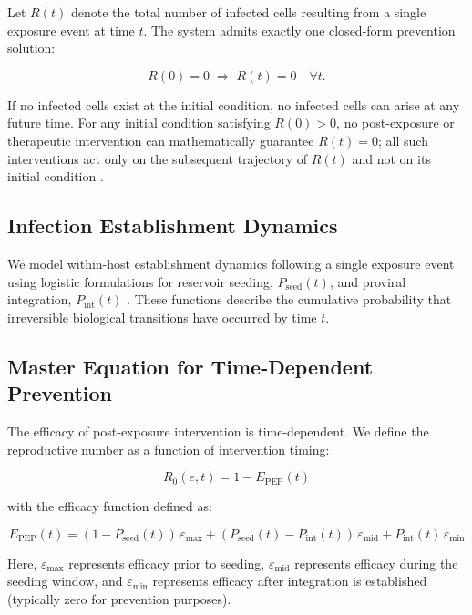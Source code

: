 \documentclass[12pt]{article}
\begin{document}
Let $R(t)$ denote the total number of infected cells resulting from a single exposure event at time $t$. The system admits exactly one closed-form prevention solution:

\begin{equation}
R(0) = 0 \;\Rightarrow\; R(t) = 0 \quad \forall t.
\end{equation}

If no infected cells exist at the initial condition, no infected cells can arise at any future time. For any initial condition satisfying $R(0) > 0$, no post-exposure or therapeutic intervention can mathematically guarantee $R(t)=0$; all such interventions act only on the subsequent trajectory of $R(t)$ and not on its initial condition \cite{grant_evidence_1987}.

\subsection{Infection Establishment Dynamics}

We model within-host establishment dynamics following a single exposure event using logistic formulations for reservoir seeding, $P_{\text{seed}}(t)$, and proviral integration, $P_{\text{int}}(t)$ \cite{mcmichael_immune_2010}. These functions describe the cumulative probability that irreversible biological transitions have occurred by time $t$.

\subsection{Master Equation for Time-Dependent Prevention}

The efficacy of post-exposure intervention is time-dependent. We define the reproductive number as a function of intervention timing:

\begin{equation}
R_0(e,t) = 1 - E_{\mathrm{PEP}}(t)
\end{equation}

with the efficacy function defined as:

\begin{equation}
E_{\mathrm{PEP}}(t) = (1 - P_{\text{seed}}(t))\,\varepsilon_{\max} + (P_{\text{seed}}(t) - P_{\text{int}}(t))\,\varepsilon_{\text{mid}} + P_{\text{int}}(t)\,\varepsilon_{\min}
\end{equation}

Here, $\varepsilon_{\max}$ represents efficacy prior to seeding, $\varepsilon_{\text{mid}}$ represents efficacy during the seeding window, and $\varepsilon_{\min}$ represents efficacy after integration is established (typically zero for prevention purposes).
\end{document}
